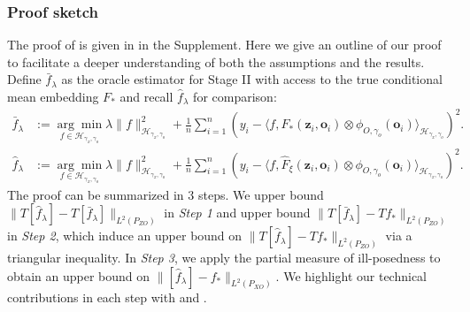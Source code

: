 \documentclass[11pt]{article}
\newcommand{\bz}{\mathbf z}
\newcommand{\bo}{\mathbf o}
\newcommand{\calH}{\mathcal{H}}
\newcommand{\0}{\mathbf{0}}
\begin{document}
\subsubsection{Proof sketch}
The proof of  is given in  in the Supplement. Here we give an outline of our proof to facilitate a deeper understanding of both the assumptions and the results. Define $\bar{f}_{\lambda}$ as the oracle estimator for Stage II with access to the true conditional mean embedding $F_\ast$ and recall $\hat{f}_{\lambda}$ for comparison:
\begin{align}
    \bar{f}_{\lambda} &:= \underset{f\in \calH_{\gamma_x,\gamma_o}}{\arg\min} \lambda \|f\|^2_{\calH_{\gamma_x,\gamma_o}} + \frac{1}{n}\sum\limits_{i=1}^{n}( y_i - \langle f, F_\ast(\bz_i,\bo_i) \otimes \phi_{O, \gamma_o}(\bo_i) \rangle_{\calH_{\gamma_x,\gamma_o}} )^2 . \label{eq:bar_f_lambda_main} \\
    \hat{f}_{\lambda} &:= \underset{f\in \calH_{\gamma_x,\gamma_o}}{\arg\min} \lambda \|f\|^2_{\calH_{\gamma_x,\gamma_o}} + \frac{1}{n}\sum\limits_{i=1}^{n}( y_i - \langle f, \hat{F}_{\xi}(\bz_i,\bo_i) \otimes \phi_{O, \gamma_o}(\bo_i) \rangle_{\calH_{\gamma_x,\gamma_o}} )^2 \label{eq:hat_f_lambda_main} .
\end{align}
The proof can be summarized in 3 steps.
We upper bound $\|T[\hat{f}_\lambda]-T[\bar{f}_\lambda]\|_{L^2\left(P_{Z O}\right)}$ in \textit{Step 1} and upper bound $\|T[\bar{f}_\lambda]-T f_*\|_{L^2(P_{Z O})}$ in \textit{Step 2}, which induce an upper bound on $\|T[\hat{f}_\lambda]-T f_*\|_{L^2(P_{Z O})}$ via a triangular inequality. In \textit{Step 3}, we apply the partial measure of ill-posedness to obtain an upper bound on $\|[\hat{f}_\lambda]- f_*\|_{L^2(P_{XO})}$. 
We highlight our technical contributions in each step with  and .
\end{document}
